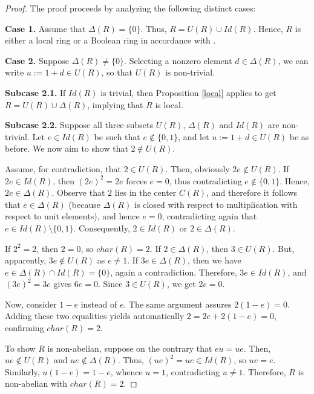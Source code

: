 \documentclass[12pt]{amsart}
\theoremstyle{definition}
\begin{document}
\begin{proof}	
The proof proceeds by analyzing the following distinct cases:

\medskip
	
\textbf{Case 1.} Assume that $\Delta(R) = \{0\}$. Thus, $R = U(R)\cup Id(R)$. Hence, $R$ is either a local ring or a Boolean ring in accordance with \cite[Theorem 2.4]{cc}.

\medskip
	
\textbf{Case 2.} Suppose $\Delta(R) \neq \{0\}$. Selecting a nonzero element $d \in \Delta(R)$, we can write $u := 1 + d \in U(R)$, so that $U(R)$ is non-trivial.
	
\textbf{Subcase 2.1.} If $Id(R)$ is trivial, then Proposition \ref{local} applies to get $R = U(R) \cup \Delta(R)$, implying that $R$ is local.
	
\textbf{Subcase 2.2.} Suppose all three subsets $U(R)$, $\Delta(R)$ and $Id(R)$ are non-trivial. Let $e \in Id(R)$ be such that $e \not\in \{0, 1\}$, and let $u := 1 + d \in U(R)$ be as before. We now aim to show that $2 \not\in U(R)$.
	
Assume, for contradiction, that $2 \in U(R)$. Then, obviously $2e \notin U(R)$. If $2e \in Id(R)$, then $(2e)^2 = 2e$ forces $e = 0$, thus contradicting $e \not\in \{0,1\}$. Hence, $2e \in \Delta(R)$. Observe that $2$ lies in the center $C(R)$, and therefore it follows that $e \in \Delta(R)$ (because $\Delta(R)$ is closed with respect to multiplication with respect to unit elements), and hence $e=0$, contradicting again that $e \in Id(R) \setminus \{0,1\}$. Consequently, $2 \in Id(R)$ or $2 \in \Delta(R)$.
	
If $2^2 = 2$, then $2 = 0$, so $char(R) = 2$. If $2 \in \Delta(R)$, then $3 \in U(R)$. But, apparently, $3e \not\in U(R)$ as $e \neq 1$. If $3e \in \Delta(R)$, then we have $e \in \Delta(R) \cap Id(R) = \{0\}$, again a contradiction. Therefore, $3e \in Id(R)$, and $(3e)^2 = 3e$ gives $6e = 0$. Since $3 \in U(R)$, we get $2e = 0$.
	
Now, consider $1 - e$ instead of $e$. The same argument assures $2(1 - e) = 0$. Adding these two equalities yields automatically $2 = 2e + 2(1 - e) = 0$, confirming $char(R) = 2$.
	
To show $R$ is non-abelian, suppose on the contrary that $eu = ue$. Then, $ue \notin U(R)$ and $ue \notin \Delta(R)$. Thus, $(ue)^2 = ue \in Id(R)$, so $ue = e$. Similarly, $u(1 - e) = 1 - e$, whence $u = 1$, contradicting $u \neq 1$. Therefore, $R$ is non-abelian with $char(R) = 2$.
	

\end{proof}
\end{document}
